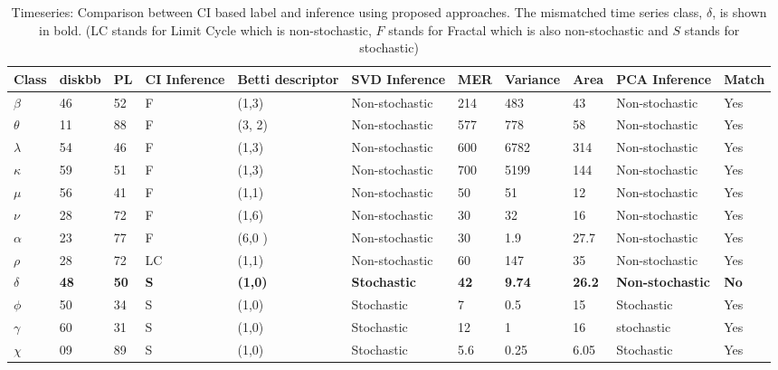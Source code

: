 \documentclass[10pt,conference]{IEEEtran}
\begin{document}
\begin{table}[t]
\caption{Timeseries: Comparison between CI based label and inference using proposed approaches. The mismatched time series class, $\delta$, is shown in bold. (LC stands for Limit Cycle \cite{Adegoke2018} which is non-stochastic, $F$ stands for Fractal which is also non-stochastic and $S$ stands for stochastic)}
\begin{center}
\begin{tabular}{|p{0.5cm}|p{0.75cm}|p{0.75cm}|p{1cm}|p{2.5cm}|p{3cm}|p{0.75cm}|p{1cm}|p{0.5cm}|p{1.8cm}|p{0.75cm}|}
\hline
Class & diskbb & PL  & CI \newline Inference & Betti descriptor & SVD  \newline Inference & MER & Variance & Area & PCA \newline Inference  &  Match \\
\hline
$\beta$ & 46 & 52 & F & (1,3) & Non-stochastic & 214 & 483 & 43 & Non-stochastic & Yes\\
\hline
$\theta$  & 11 &  88 & F & (3, 2) & Non-stochastic & 577 & 778 & 58&Non-stochastic  &  Yes \\
\hline
$\lambda$ &  54 & 46 & F & (1,3) & Non-stochastic & 600 & 6782 & 314 & Non-stochastic & Yes \\
\hline
$\kappa$ &  59 & 51 & F & (1,3) & Non-stochastic & 700 & 5199 & 144 & Non-stochastic &  Yes \\
\hline
$\mu$  & 56 & 41 & F & (1,1) & Non-stochastic & 50 & 51 & 12 & Non-stochastic & Yes \\
\hline
$\nu$  & 28 & 72 & F & (1,6) & Non-stochastic & 30 & 32 & 16 & Non-stochastic & Yes\\
\hline
$\alpha$  & 23 & 77& F & (6,0 ) & Non-stochastic & 30 & 1.9 & 27.7 & Non-stochastic & Yes \\
\hline
$\rho$  & 28 & 72 & LC & (1,1) &  Non-stochastic & 60 & 147 & 35 & Non-stochastic & Yes \\
\hline
\textbf{$\delta$}  & \textbf{48} & \textbf{50} &  \textbf{S} & \textbf{(1,0)}& \textbf{Stochastic}& \textbf{42} & \textbf{9.74} & \textbf{26.2} & \textbf{Non-stochastic} &  \textbf{No} \\
\hline
$\phi$  & 50 & 34 & S & (1,0)& Stochastic & 7 & 0.5 & 15 & Stochastic &  Yes \\
\hline
$\gamma$  & 60 & 31 & S & (1,0)& Stochastic & 12 & 1 & 16 & stochastic &  Yes \\
\hline
$\chi$  & 09 & 89 & S & (1,0)& Stochastic & 5.6 & 0.25 & 6.05 & Stochastic &  Yes \\
\hline
\end{tabular}
\label{tab:results}
\end{center}
\end{table}
\end{document}

